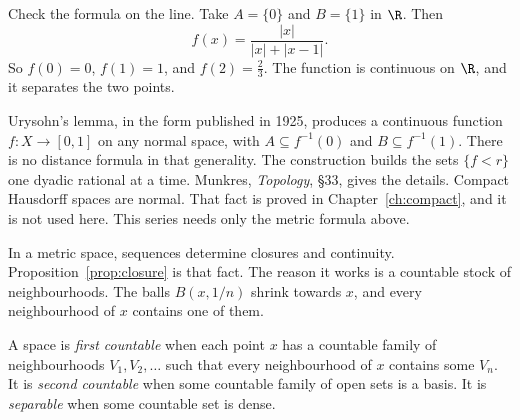 Check the formula on the line. Take $A=\{0\}$ and $B=\{1\}$ in $\R$. Then
\[
f(x)=\frac{|x|}{|x|+|x-1|}.
\]
So $f(0)=0$, $f(1)=1$, and $f(2)=\frac23$. The function is continuous on $\R$, and it separates the two points.

\begin{remark}
Urysohn's lemma, in the form published in 1925, produces a continuous function $f:X\to[0,1]$ on any normal space, with $A\subseteq f^{-1}(0)$ and $B\subseteq f^{-1}(1)$. There is no distance formula in that generality. The construction builds the sets $\{f<r\}$ one dyadic rational at a time. Munkres, \emph{Topology}, \S33, gives the details. Compact Hausdorff spaces are normal. That fact is proved in Chapter~\ref{ch:compact}, and it is not used here. This series needs only the metric formula above.
\end{remark}

In a metric space, sequences determine closures and continuity. Proposition~\ref{prop:closure} is that fact. The reason it works is a countable stock of neighbourhoods. The balls $B(x,1/n)$ shrink towards $x$, and every neighbourhood of $x$ contains one of them.

\begin{definition}
A space is \emph{first countable} when each point $x$ has a countable family of neighbourhoods $V_1,V_2,\ldots$ such that every neighbourhood of $x$ contains some $V_n$. It is \emph{second countable} when some countable family of open sets is a basis. It is \emph{separable} when some countable set is dense.
\end{definition}

